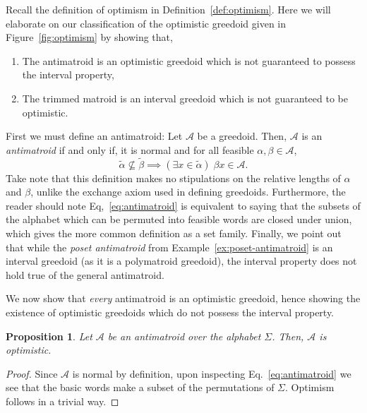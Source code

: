 \documentclass[11pt]{article}
\newtheorem{proposition}[theorem]{Proposition}
\newcommand{\univ}{\Sigma}
\begin{document}
Recall the definition of optimism in Definition~\ref{def:optimism}.
Here we will elaborate on our classification of the optimistic greedoid given in Figure~\ref{fig:optimism} by showing that,
\begin{enumerate}
    \item The antimatroid is an optimistic greedoid which is not guaranteed to possess the interval property,
    \item The trimmed matroid is an interval greedoid which is not guaranteed to be optimistic.
\end{enumerate}
First we must define an antimatroid:
Let $\mathcal{A}$ be a greedoid.
Then, $\mathcal{A}$ is an \emph{antimatroid} if and only if, it is normal and for all feasible $\alpha,\beta \in \mathcal{A}$,
\begin{equation}\label{eq:antimatroid}
    \widetilde{\alpha}\not\subseteq\widetilde{\beta} \implies (\exists x \in \widetilde{\alpha})\;\beta x \in\mathcal{A}.
\end{equation}
Take note that this definition makes no stipulations on the relative lengths of $\alpha$ and $\beta$, unlike the exchange axiom used in defining greedoids.
Furthermore, the reader should note Eq,~\ref{eq:antimatroid} is equivalent to saying that the subsets of the alphabet which can be permuted into feasible words are closed under union, which gives the more common definition as a set family.
Finally, we point out that while the \emph{poset antimatroid} from Example~\ref{ex:poset-antimatroid} is an interval greedoid (as it is a polymatroid greedoid), the interval property does not hold true of the general antimatroid.

We now show that \emph{every} antimatroid is an optimistic greedoid, hence showing the existence of optimistic greedoids which do not possess the interval property.
\begin{proposition}
    Let $\mathcal{A}$ be an antimatroid over the alphabet $\univ$. Then, $\mathcal{A}$ is optimistic.
\end{proposition}
\begin{proof}    
    Since $\mathcal{A}$ is normal by definition, upon inspecting Eq.~\ref{eq:antimatroid} we see that the basic words make a subset of the permutations of $\univ$.
Optimism follows in a trivial way.
\end{proof}
\end{document}
